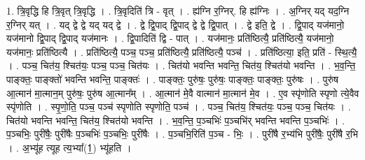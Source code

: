 \documentclass[17pt]{extarticle}
\begin{document}
1. त्रि॒वृद्धि हि त्रि॒वृत् त्रि॒वृद्धि । . त्रि॒वृदिति॑ त्रि - वृत् । . ह्य॑ग्नि र॒ग्निर्. हि ह्य॑ग्निः । . अ॒ग्निर् यद् यद॒ग्नि र॒ग्निर् यत् । . यद् द्वे द्वे यद् यद् द्वे । . द्वे द्वि॒पाद् द्वि॒पाद् द्वे द्वे द्वि॒पात् । . द्वे इति॒ द्वे । . द्वि॒पाद् यज॑मानो॒ यज॑मानो द्वि॒पाद् द्वि॒पाद् यज॑मानः । . द्वि॒पादिति॑ द्वि - पात् । . यज॑मानः॒ प्रति॑ष्ठित्यै॒ प्रति॑ष्ठित्यै॒ यज॑मानो॒ यज॑मानः॒ प्रति॑ष्ठित्यै । . प्रति॑ष्ठित्यै॒ पञ्च॒ पञ्च॒ प्रति॑ष्ठित्यै॒ प्रति॑ष्ठित्यै॒ पञ्च॑ । . प्रति॑ष्ठित्या॒ इति॒ प्रति॑ - स्थि॒त्यै॒ । . पञ्च॒ चित॑य॒ श्चित॑यः॒ पञ्च॒ पञ्च॒ चित॑यः । . चित॑यो भवन्ति भवन्ति॒ चित॑य॒ श्चित॑यो भवन्ति । . भ॒व॒न्ति॒ पाङ्क्तः॒ पाङ्क्तो॑ भवन्ति भवन्ति॒ पाङ्क्तः॑ । . पाङ्क्तः॒ पुरु॑षः॒ पुरु॑षः॒ पाङ्क्तः॒ पाङ्क्तः॒ पुरु॑षः । . पुरु॑ष आ॒त्मान॑ मा॒त्मान॒म् पुरु॑षः॒ पुरु॑ष आ॒त्मान᳚म् । . आ॒त्मान॑ मे॒वै वात्मान॑ मा॒त्मान॑ मे॒व । . ए॒व स्पृ॑णोति स्पृणो त्ये॒वैव स्पृ॑णोति । . स्पृ॒णो॒ति॒ पञ्च॒ पञ्च॑ स्पृणोति स्पृणोति॒ पञ्च॑ । . पञ्च॒ चित॑य॒ श्चित॑यः॒ पञ्च॒ पञ्च॒ चित॑यः । . चित॑यो भवन्ति भवन्ति॒ चित॑य॒ श्चित॑यो भवन्ति । . भ॒व॒न्ति॒ प॒ञ्चभिः॑ प॒ञ्चभि॑र् भवन्ति भवन्ति प॒ञ्चभिः॑ । . प॒ञ्चभिः॒ पुरी॑षैः॒ पुरी॑षैः प॒ञ्चभिः॑ प॒ञ्चभिः॒ पुरी॑षैः । . प॒ञ्चभि॒रिति॑ प॒ञ्च - भिः॒ । . पुरी॑षै र॒भ्य॑भि पुरी॑षैः॒ पुरी॑षै र॒भि । . अ॒भ्यू॑ह त्यूह त्य॒भ्या᳚(1॒) भ्यू॑हति । \newline
\end{document}
